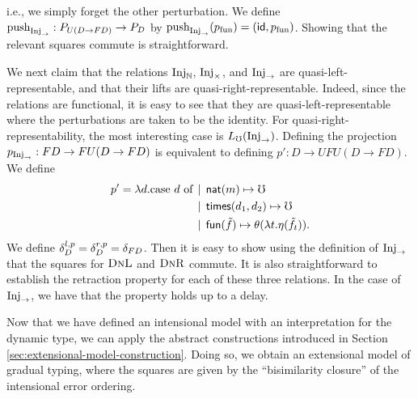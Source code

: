 %
i.e., we simply forget the other perturbation.
%
We define $\text{push}_{\text{Inj}_\to} : P_{U(D \to FD)} \to P_D$ by \( \text{push}_{\text{Inj}_\to}(p_{\text{fun}}) = (\mathsf{id}, p_{\text{fun}}) \).
%
Showing that the relevant squares commute is straightforward.
%


We next claim that the relations $\text{Inj}_\mathbb{N}$, $\text{Inj}_\times$, and $\text{Inj}_\to$ are quasi-left-representable,
and that their lifts are quasi-right-representable.
Indeed, since the relations are functional, it is easy to see that they are quasi-left-representable
where the perturbations are taken to be the identity.
%
For quasi-right-representability, the most interesting case is $L_\mho(\text{Inj}_\to)$.
Defining the projection $p_{\text{Inj}_\to} : FD \to FU(D \to FD)$ is equivalent to defining
$p' : D \to UFU(D \to FD)$. We define
\begin{align*}
 p' = \lambda d.\text{case $d$ of}   &\mathrel{\bf \,\mid\,} \mathsf{nat}(m) \mapsto \mho \\
    &\mathrel{\bf \,\mid\,} \mathsf{times}(d_1, d_2) \mapsto \mho \\
    &\mathrel{\bf \,\mid\,} \mathsf{fun}(\tilde{f}) \mapsto \theta (\lambda t. \eta(\tilde{f}_t)).
\end{align*}
%
We define $\delta^{l,p}_D = \delta^{r,p}_D = \delta_{FD}$.
Then it is easy to show using the definition of $\text{Inj}_\to$ that the squares for $\textsc{DnL}$ and $\textsc{DnR}$ commute.
%
It is also straightforward to establish the retraction property for
each of these three relations. In the case of $\text{Inj}_\to$, we
have that the property holds up to a delay.


Now that we have defined an intensional model with an interpretation for the dynamic type, we can apply
the abstract constructions introduced in Section \ref{sec:extensional-model-construction}.
Doing so, we obtain an extensional model of gradual typing, where the squares are given by the
``bisimilarity closure'' of the intensional error ordering.

